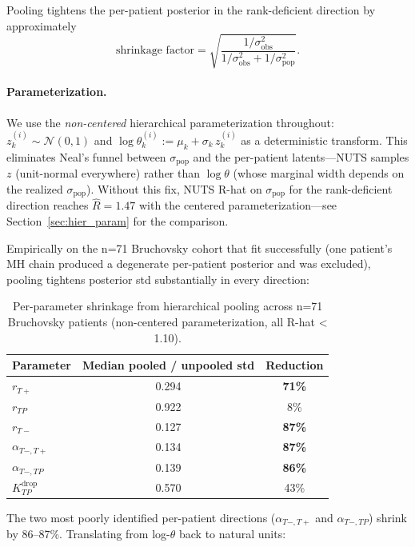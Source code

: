 \documentclass[11pt]{article}
\newcommand{\Kdrop}{K_{TP}^{\text{drop}}}
\newcommand{\Tplus}{T{+}}
\newcommand{\Tminus}{T{-}}
\newcommand{\rhat}{\hat{R}}
\begin{document}
Pooling tightens the per-patient posterior in the rank-deficient direction by
approximately
\begin{equation*}
\text{shrinkage factor} = \sqrt{\frac{1/\sigma_\text{obs}^2}{1/\sigma_\text{obs}^2 + 1/\sigma_\text{pop}^2}}.
\end{equation*}
\paragraph{Parameterization.} We use the \emph{non-centered} hierarchical
parameterization throughout: $z_k^{(i)} \sim \mathcal{N}(0, 1)$ and
$\log\theta_k^{(i)} := \mu_k + \sigma_k\, z_k^{(i)}$ as a deterministic
transform. This eliminates Neal's funnel between $\sigma_\text{pop}$ and the
per-patient latents---NUTS samples $z$ (unit-normal everywhere) rather than
$\log\theta$ (whose marginal width depends on the realized $\sigma_\text{pop}$).
Without this fix, NUTS R-hat on $\sigma_\text{pop}$ for the rank-deficient
direction reaches $\rhat = 1.47$ with the centered parameterization---see
Section~\ref{sec:hier_param} for the comparison.

Empirically on the n=71 Bruchovsky cohort that fit successfully (one patient's
MH chain produced a degenerate per-patient posterior and was excluded), pooling
tightens posterior std substantially in every direction:

\begin{table}[h]
\centering
\begin{tabular}{lcc}
\toprule
Parameter & Median pooled / unpooled std & Reduction \\
\midrule
$r_{\Tplus}$ & 0.294 & \textbf{71\%} \\
$r_{TP}$ & 0.922 & 8\% \\
$r_{\Tminus}$ & 0.127 & \textbf{87\%} \\
$\alpha_{\Tminus,\Tplus}$ & 0.134 & \textbf{87\%} \\
$\alpha_{\Tminus,TP}$ & 0.139 & \textbf{86\%} \\
$\Kdrop$ & 0.570 & 43\% \\
\bottomrule
\end{tabular}
\caption{Per-parameter shrinkage from hierarchical pooling across n=71 Bruchovsky
patients (non-centered parameterization, all R-hat < 1.10).}
\end{table}

The two most poorly identified per-patient directions ($\alpha_{\Tminus,\Tplus}$
and $\alpha_{\Tminus,TP}$) shrink by 86--87\%. Translating from log-$\theta$
back to natural units:
\end{document}
